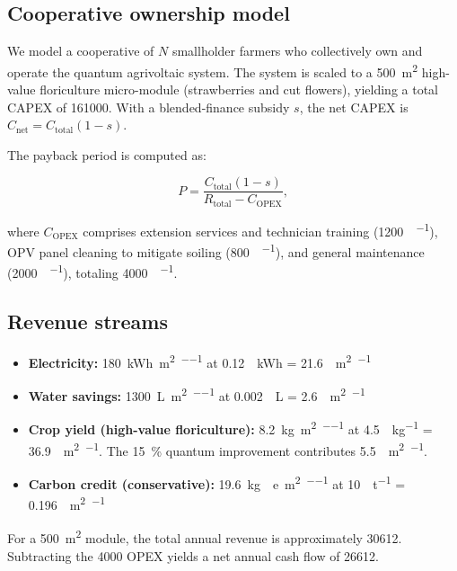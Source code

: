 \documentclass[11pt,a4paper]{article}
\begin{document}
\subsection{Cooperative ownership model}

We model a cooperative of $N$ smallholder farmers who collectively own and operate the quantum agrivoltaic system.
The system is scaled to a \qty{500}{\m\squared} high-value floriculture micro-module (strawberries and cut flowers), yielding a total CAPEX of \qty{161000}{\USD}.
With a blended-finance subsidy $s$, the net CAPEX is $C_{\mathrm{net}} = C_{\mathrm{total}}(1 - s)$.

The payback period is computed as:

\begin{equation}
P = \frac{C_{\mathrm{total}} (1 - s)}{R_{\mathrm{total}} - C_{\mathrm{OPEX}}},
\label{eq:SI_payback}
\end{equation}

where $C_{\mathrm{OPEX}}$ comprises extension services and technician training (\qty{1200}{\USD\per\yr}), OPV panel cleaning to mitigate soiling (\qty{800}{\USD\per\yr}), and general maintenance (\qty{2000}{\USD\per\yr}), totaling \qty{4000}{\USD\per\yr}.

\subsection{Revenue streams}

\begin{itemize}
\item \textbf{Electricity:} \qty{180}{\kWh\per\m\squared\per\yr} at \qty{0.12}{\per\kWh} = \qty{21.6}{\per\m\squared\per\yr}
\item \textbf{Water savings:} \qty{1300}{\L\per\m\squared\per\yr} at \qty{0.002}{\per\L} = \qty{2.6}{\per\m\squared\per\yr}
\item \textbf{Crop yield (high-value floriculture):} \qty{8.2}{\kg\per\m\squared\per\yr} at \qty{4.5}{\USD\per\kg} = \qty{36.9}{\per\m\squared\per\yr}. The \qty{15}{\percent} quantum improvement contributes \qty{5.5}{\per\m\squared\per\yr}.
\item \textbf{Carbon credit (conservative):} \qty{19.6}{\kg{}e\per\m\squared\per\yr} at \qty{10}{\USD\per\tonne} = \qty{0.196}{\per\m\squared\per\yr}
\end{itemize}
For a \qty{500}{\m\squared} module, the total annual revenue is approximately \qty{30612}{\USD}. Subtracting the \qty{4000}{\USD} OPEX yields a net annual cash flow of \qty{26612}{\USD}.
\end{document}
